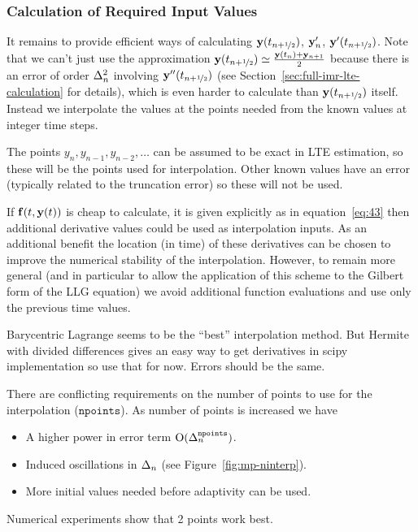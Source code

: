 \subsubsection{Calculation of Required Input Values}
\label{sec:calc-requ-input}

It remains to provide efficient ways of calculating $\yvhf$, $\yv_n'$, $\yvhf[']$.
Note that we can't just use the approximation $\yvhf \simeq \frac{\yv(t_n) + \yv_{n+1}}{2}$ because there is an error of order $\dtn^2$ involving $\yvhf['']$ (see Section~\ref{sec:full-imr-lte-calculation} for details), which is even harder to calculate than $\yvhf$ itself.
Instead we interpolate the values at the points needed from the known values at integer time steps.

The points $y_n, y_{n-1}, y_{n-2}, \ldots$ can be assumed to be exact in LTE estimation, so these will be the points used for interpolation.
Other known values have an error (typically related to the truncation error) so these will not be used.

If $\fv(t, \yv(t))$ is cheap to calculate, \ie it is given explicitly as in equation~\eqref{eq:43} then additional derivative values could be used as interpolation inputs.
As an additional benefit the location (in time) of these derivatives can be chosen to improve the numerical stability of the interpolation.
However, to remain more general (and in particular to allow the application of this scheme to the Gilbert form of the LLG equation) we avoid additional function evaluations and use only the previous time values.

Barycentric Lagrange seems to be the ``best'' interpolation method.\cite{Berrut2004}
But Hermite with divided differences gives an easy way to get derivatives in scipy implementation so use that for now.
Errors should be the same.


There are conflicting requirements on the number of points to use for the interpolation ($\texttt{npoints}$). As number of points is increased we have
\begin{itemize}
\item A higher power in error term $\order{\dtn^\texttt{npoints}}$.
\item Induced oscillations in $\dtn$ (see Figure~\ref{fig:mp-ninterp}).
\item More initial values needed before adaptivity can be used.
\end{itemize}
Numerical experiments show that 2 points work best.


